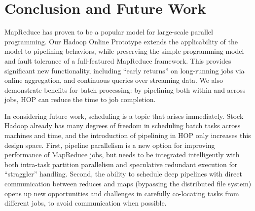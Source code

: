 \section{Conclusion and Future Work}
\label{sec:concl}
MapReduce has proven to be a popular model for large-scale parallel programming. Our Hadoop Online Prototype extends the applicability of the model to pipelining behaviors, while preserving the simple programming model and fault tolerance of a full-featured MapReduce framework.  This provides significant new functionality, including ``early returns'' on long-running jobs via online aggregation, and continuous queries over streaming data.  We also demonstrate benefits for batch processing:  by pipelining both within and across jobs, HOP can 
reduce the time to job completion. 

In considering future work, scheduling is a topic that arises immediately.
Stock Hadoop already has many degrees of freedom in scheduling batch tasks across machines and time, and the introduction of pipelining in HOP only increases this design space.  First, pipeline parallelism is a new option for improving performance of MapReduce jobs, but needs to be integrated intelligently with both intra-task partition parallelism and speculative redundant execution for ``straggler'' handling.
Second, the ability to schedule deep pipelines with direct
communication between reduces and maps (bypassing the distributed file
system) opens up new opportunities and challenges in carefully co-locating tasks from different jobs, to avoid communication when possible.  

